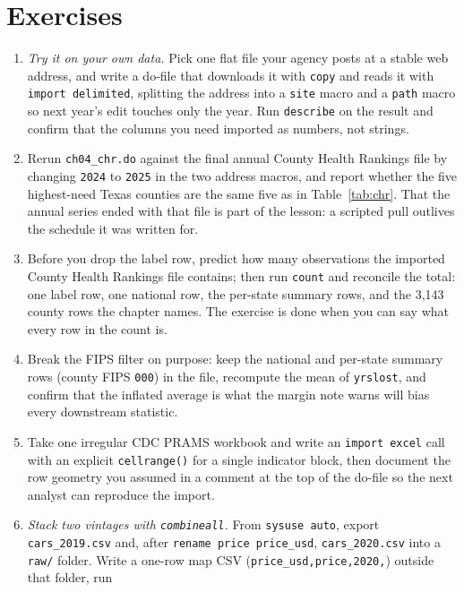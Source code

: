 \section*{Exercises}
\begin{enumerate}
  \item \emph{Try it on your own data.} Pick one flat file your
    agency posts at a stable web address, and write a do-file that
    downloads it with \texttt{copy} and reads it with
    \texttt{import delimited}, splitting the address into a
    \texttt{site} macro and a \texttt{path} macro so next year's
    edit touches only the year. Run \texttt{describe} on the result
    and confirm that the columns you need imported as numbers, not
    strings.
  \item Rerun \texttt{ch04\_chr.do} against the final annual County
    Health Rankings file by changing \texttt{2024} to \texttt{2025}
    in the two address macros, and report whether the five
    highest-need Texas counties are the same five as in
    Table~\ref{tab:chr}. That the annual series ended with that
    file is part of the lesson: a scripted pull outlives the
    schedule it was written for.
  \item Before you drop the label row, predict how many observations
    the imported County Health Rankings file contains; then run
    \texttt{count} and reconcile the total: one label row, one
    national row, the per-state summary rows, and the 3{,}143 county
    rows the chapter names. The exercise is done when you can
    say what every row in the count is.
  \item Break the FIPS filter on purpose: keep the national and
    per-state summary rows (county FIPS \texttt{000}) in the file,
    recompute the mean of \texttt{yrslost}, and confirm that the
    inflated average is what the margin note warns will bias every
    downstream statistic.
  \item Take one irregular CDC PRAMS workbook and write an
    \texttt{import excel} call with an explicit \texttt{cellrange()}
    for a single indicator block, then document the row geometry you
    assumed in a comment at the top of the do-file so the next
    analyst can reproduce the import.
  \item \emph{Stack two vintages with \texttt{combineall}.} From
    \texttt{sysuse auto}, export \texttt{cars\_2019.csv} and, after
    \texttt{rename price price\_usd}, \texttt{cars\_2020.csv} into a
    \texttt{raw/} folder. Write a one-row map CSV
    (\texttt{price\_usd,price,2020,}) outside that folder, run

\end{enumerate}
